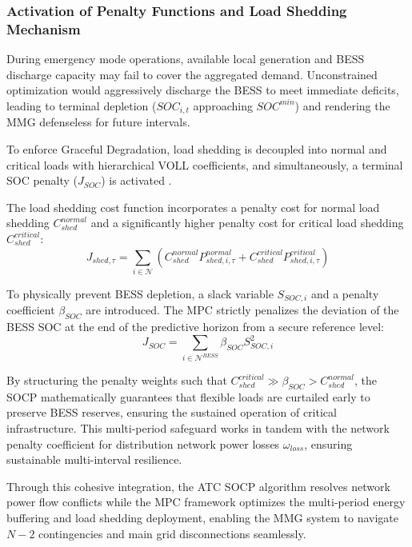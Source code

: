 \subsubsection{Activation of Penalty Functions and Load Shedding Mechanism}

During emergency mode operations, available local generation and BESS discharge capacity may fail to cover the aggregated demand. Unconstrained optimization would aggressively discharge the BESS to meet immediate deficits, leading to terminal depletion ($SOC_{i,t}$ approaching $SOC^{min}$) and rendering the MMG defenseless for future intervals. 

To enforce Graceful Degradation, load shedding is decoupled into normal and critical loads with hierarchical VOLL coefficients, and simultaneously, a terminal SOC penalty ($J_{SOC}$) is activated \cite{Palangari2025_MPC}. 

The load shedding cost function incorporates a penalty cost for normal load shedding $C_{shed}^{normal}$ and a significantly higher penalty cost for critical load shedding $C_{shed}^{critical}$:
\begin{equation} \label{eq:MPC_load_shedding}
    J_{shed,\tau} = \sum_{i \in \mathcal{N}} \left( C_{shed}^{normal} P_{shed,i,\tau}^{normal} + C_{shed}^{critical} P_{shed,i,\tau}^{critical} \right)
\end{equation}

To physically prevent BESS depletion, a slack variable $S_{SOC,i}$ and a penalty coefficient $\beta_{SOC}$ are introduced. The MPC strictly penalizes the deviation of the BESS SOC at the end of the predictive horizon from a secure reference level:
\begin{equation} \label{eq:MPC_SOC_penalty}
    J_{SOC} = \sum_{i \in \mathcal{N}^{BESS}} \beta_{SOC} S_{SOC,i}^2
\end{equation}

By structuring the penalty weights such that $C_{shed}^{critical} \gg \beta_{SOC} > C_{shed}^{normal}$, the SOCP mathematically guarantees that flexible loads are curtailed early to preserve BESS reserves, ensuring the sustained operation of critical infrastructure. This multi-period safeguard works in tandem with the network penalty coefficient for distribution network power losses $\omega_{loss}$, ensuring sustainable multi-interval resilience.

Through this cohesive integration, the ATC SOCP algorithm resolves network power flow conflicts while the MPC framework optimizes the multi-period energy buffering and load shedding deployment, enabling the MMG system to navigate $N-2$ contingencies and main grid disconnections seamlessly.

